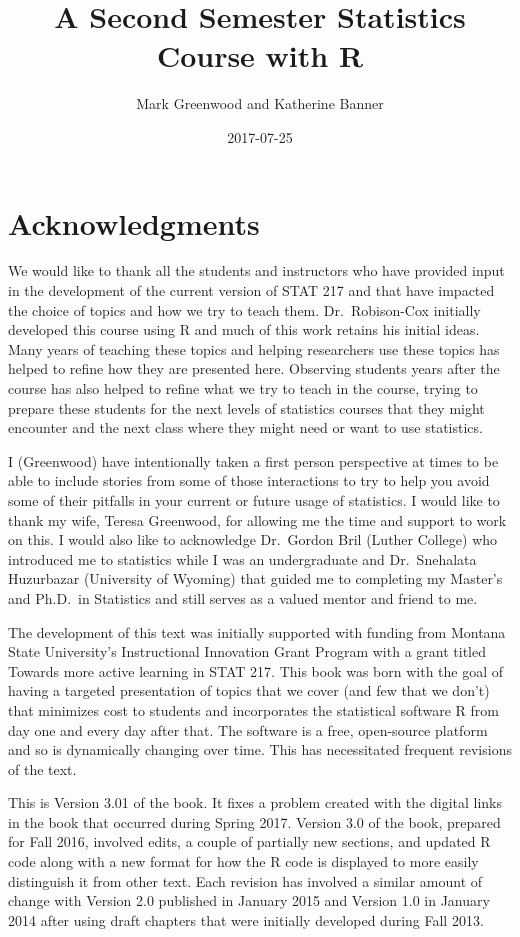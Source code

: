 \documentclass[]{book}
\title{A Second Semester Statistics Course with R}
\author{Mark Greenwood and Katherine Banner}
\date{2017-07-25}
\theoremstyle{definition}
\theoremstyle{definition}
\theoremstyle{remark}
\begin{document}
\maketitle

{
\setcounter{tocdepth}{1}
\tableofcontents
}
\chapter*{Acknowledgments}\label{acknowledgments}

We would like to thank all the students and instructors who have
provided input in the development of the current version of STAT 217 and
that have impacted the choice of topics and how we try to teach them.
Dr.~Robison-Cox initially developed this course using R and much of this
work retains his initial ideas. Many years of teaching these topics and
helping researchers use these topics has helped to refine how they are
presented here. Observing students years after the course has also
helped to refine what we try to teach in the course, trying to prepare
these students for the next levels of statistics courses that they might
encounter and the next class where they might need or want to use
statistics.

I (Greenwood) have intentionally taken a first person perspective at
times to be able to include stories from some of those interactions to
try to help you avoid some of their pitfalls in your current or future
usage of statistics. I would like to thank my wife, Teresa Greenwood,
for allowing me the time and support to work on this. I would also like
to acknowledge Dr.~Gordon Bril (Luther College) who introduced me to
statistics while I was an undergraduate and Dr.~Snehalata Huzurbazar
(University of Wyoming) that guided me to completing my Master's and
Ph.D.~in Statistics and still serves as a valued mentor and friend to
me.

The development of this text was initially supported with funding from
Montana State University's Instructional Innovation Grant Program with a
grant titled Towards more active learning in STAT 217. This book was
born with the goal of having a targeted presentation of topics that we
cover (and few that we don't) that minimizes cost to students and
incorporates the statistical software R from day one and every day after
that. The software is a free, open-source platform and so is dynamically
changing over time. This has necessitated frequent revisions of the
text.

This is Version 3.01 of the book. It fixes a problem created with the
digital links in the book that occurred during Spring 2017. Version 3.0
of the book, prepared for Fall 2016, involved edits, a couple of
partially new sections, and updated R code along with a new format for
how the R code is displayed to more easily distinguish it from other
text. Each revision has involved a similar amount of change with Version
2.0 published in January 2015 and Version 1.0 in January 2014 after
using draft chapters that were initially developed during Fall 2013.
\end{document}

